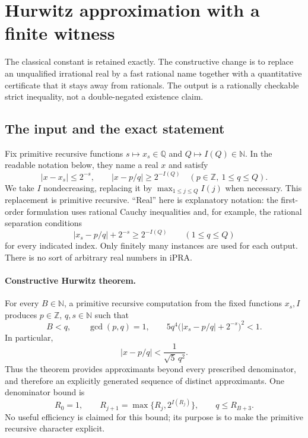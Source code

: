 \section{Hurwitz approximation with a finite witness}
\label{sec:constructive-hurwitz}

The classical constant is retained exactly.  The constructive change is to
replace an unqualified irrational real by a fast rational name together with a
quantitative certificate that it stays away from rationals.  The output is a
rationally checkable strict inequality, not a double-negated existence claim.

\subsection{The input and the exact statement}

Fix primitive recursive functions \(s\mapsto x_s\in\mathbb Q\) and
\(Q\mapsto I(Q)\in\mathbb N\).  In the readable notation below, they name a
real \(x\) and satisfy
\begin{equation}\label{eq:hw-name}
 |x-x_s|\le 2^{-s},\qquad
 |x-p/q|\ge 2^{-I(Q)}
 \quad(p\in\mathbb Z,\ 1\le q\le Q).
\end{equation}
We take \(I\) nondecreasing, replacing it by
\(\max_{1\le j\le Q}I(j)\) when necessary.  This replacement is primitive
recursive.  ``Real'' here is explanatory notation: the first-order formulation
uses rational Cauchy inequalities and, for example, the rational separation
conditions
\[
 |x_s-p/q|+2^{-s}\ge2^{-I(Q)}
 \qquad(1\le q\le Q)
\]
for every indicated index.  Only finitely many instances are used for each
output.  There is no sort of arbitrary real numbers in iPRA.

\paragraph{Constructive Hurwitz theorem.}
For every \(B\in\mathbb N\), a primitive recursive computation from the fixed
functions \(x_s,I\) produces \(p\in\mathbb Z\), \(q,s\in\mathbb N\) such that
\begin{equation}\label{eq:hw-certificate}
 B<q,\qquad \gcd(p,q)=1,\qquad
 5q^4\bigl(|x_s-p/q|+2^{-s}\bigr)^2<1.
\end{equation}
In particular,
\[
 |x-p/q|<\frac1{\sqrt5\,q^2}.
\]
Thus the theorem provides approximants beyond every prescribed denominator,
and therefore an explicitly generated sequence of distinct approximants.
One denominator bound is
\begin{equation}\label{eq:hw-R}
 R_0=1,\qquad R_{j+1}=\max\{R_j,2^{I(R_j)}\},\qquad
 q\le R_{B+3}.
\end{equation}
No useful efficiency is claimed for this bound; its purpose is to make the
primitive recursive character explicit.


